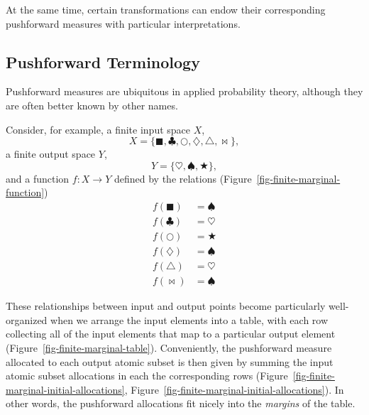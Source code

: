 \documentclass[
  letterpaper,
  DIV=11,
  numbers=noendperiod]{scrartcl}
\begin{document}
At the same time, certain transformations can endow their corresponding
pushforward measures with particular interpretations.

\subsection{Pushforward Terminology}\label{sec:terminology}

Pushforward measures are ubiquitous in applied probability theory,
although they are often better known by other names.

Consider, for example, a finite input space \(X\), \[
X = \{ \blacksquare, \clubsuit, \bigcirc,
       \diamondsuit, \triangle, \bowtie \},
\] a finite output space \(Y\), \[
Y = \{ \heartsuit, \spadesuit, \bigstar \},
\] and a function \(f : X \rightarrow Y\) defined by the relations
(Figure~\ref{fig-finite-marginal-function}) \begin{align*}
f(\blacksquare) &= \spadesuit
\\
f(\clubsuit) &= \heartsuit
\\
f(\bigcirc) &= \bigstar
\\
f(\diamondsuit) &= \spadesuit
\\
f(\triangle) &= \heartsuit
\\
f(\bowtie) &= \spadesuit
\end{align*}

These relationships between input and output points become particularly
well-organized when we arrange the input elements into a table, with
each row collecting all of the input elements that map to a particular
output element (Figure~\ref{fig-finite-marginal-table}). Conveniently,
the pushforward measure allocated to each output atomic subset is then
given by summing the input atomic subset allocations in each the
corresponding rows
(Figure~\ref{fig-finite-marginal-initial-allocations},
Figure~\ref{fig-finite-marginal-initial-allocations}). In other words,
the pushforward allocations fit nicely into the \emph{margins} of the
table.
\end{document}

